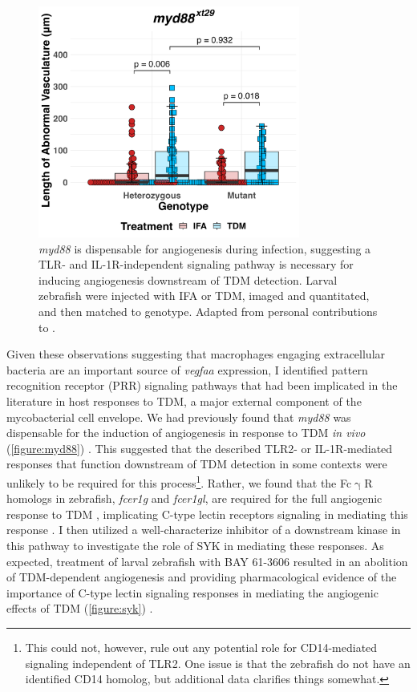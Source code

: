 \begin{figure}
\centering
\includegraphics[height=3in]{images/JB96_myd88_TDM_120522.png}
\caption[\textit{myd88} is dispensable for angiogenesis]{\textit{myd88} is dispensable for angiogenesis during infection, suggesting a TLR\hyp{} and IL\hyp{}1R\hyp{}independent signaling pathway is necessary for inducing angiogenesis downstream of TDM detection. Larval zebrafish were injected with IFA or TDM, imaged and quantitated, and then matched to genotype. Adapted from personal contributions to \citet{Walton2018}.}
\label{figure:myd88}

\end{figure}

Given these observations suggesting that macrophages engaging extracellular bacteria are an important source of \textit{vegfaa} expression, I identified pattern recognition receptor (PRR) signaling pathways that had been implicated in the literature in host responses to TDM, a major external component of the mycobacterial cell envelope. We had previously found that \textit{myd88} was dispensable for the induction of angiogenesis in response to TDM \textit{in vivo} (\autoref{figure:myd88}) \citep{Bowdish2009, Walton2018}. This suggested that the described TLR2\hyp{} or IL\hyp{}1R\hyp{}mediated responses that function downstream of TDM detection in some contexts were unlikely to be required for this process\footnote{This could not, however, rule out any potential role for CD14\hyp{}mediated signaling independent of TLR2. One issue is that the zebrafish do not have an identified CD14 homolog, but additional data clarifies things somewhat.}. Rather, we found that the Fc$\upgamma$R homologs in zebrafish, \textit{fcer1g} and \textit{fcer1gl}, are required for the full angiogenic response to TDM \citep{Walton2018}, implicating C\hyp{}type lectin receptors signaling in mediating this response \citep{Richardson2014, Zhao2014}. I then utilized a well\hyp{}characterize inhibitor of a downstream kinase in this pathway to investigate the role of SYK in mediating these responses. As expected, treatment of larval zebrafish with BAY 61\hyp{}3606 resulted in an abolition of TDM\hyp{}dependent angiogenesis and providing pharmacological evidence of the importance of C\hyp{}type lectin signaling responses in mediating the angiogenic effects of TDM (\autoref{figure:syk}) \citep{Ghotra2015, Xu2018b}. 

